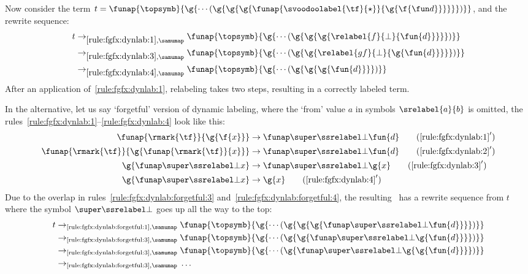 \begin{remark}
  \noindent
  Now consider the term $t = \funap{\topsymb}{\g{\cdots(\g{\g{\g{\funap{\svoodoolabel{\tf}{\star}}{\g{\f{\fun{d}}}}}}})}}$,
and the rewrite sequence:
  \begin{align*}
    t
    \to_{\ref{rule:fgfx:dynlab:1},\samumap} {}
    &
    \funap{\topsymb}{\g{\cdots(\g{\g{\g{\relabel{f}{\bot}{\fun{d}}}}})}}
    \\
    {} \to_{\ref{rule:fgfx:dynlab:3},\samumap} {}
    &
    \funap{\topsymb}{\g{\cdots(\g{\g{\relabel{\mit{gf}}{\bot}{\g{\fun{d}}}}})}}
    \\
    {} \to_{\ref{rule:fgfx:dynlab:4},\samumap} {}
    &
    \funap{\topsymb}{\g{\cdots(\g{\g{\g{\fun{d}}}})}}
  \end{align*}
  After an application of~\eqref{rule:fgfx:dynlab:1}, relabeling takes two steps,
  resulting in a correctly labeled term.

  In the alternative, let us say `forgetful' version of dynamic labeling,
  where the `from' value $a$ in symbols $\srelabel{a}{b}$ is omitted,
  the rules~\eqref{rule:fgfx:dynlab:1}--\eqref{rule:fgfx:dynlab:4} look like this:
  \begin{align}
    \funap{\rmark{\tf}}{\g{\f{x}}} &\to \relabelto{\bot}{\fun{d}}
    \label{rule:fgfx:dynlab:forgetful:1}
    \tag{$\ref{rule:fgfx:dynlab:1}'$}
    \\
    \funap{\rmark{\tf}}{\g{\funap{\rmark{\tf}}{x}}} &\to \relabelto{\bot}{\fun{d}}
    \label{rule:fgfx:dynlab:forgetful:2}
    \tag{$\ref{rule:fgfx:dynlab:2}'$}
    \\ 
    \g{\relabelto{\bot}{x}} &\to \relabelto{\bot}{\g{x}}
    \label{rule:fgfx:dynlab:forgetful:3}
    \tag{$\ref{rule:fgfx:dynlab:3}'$}
    \\
    \g{\relabelto{\bot}{x}} &\to \g{x}
    \label{rule:fgfx:dynlab:forgetful:4}
    \tag{$\ref{rule:fgfx:dynlab:4}'$}
  \end{align}
Due to the overlap in rules~\eqref{rule:fgfx:dynlab:forgetful:3} and~\eqref{rule:fgfx:dynlab:forgetful:4},
  the resulting \csTRS\ has a rewrite sequence 
  from $t$ where the symbol $\srelabelto{\bot}$ goes up all the way to the top:
  \begin{align*}
    t \to_{\text{\ref{rule:fgfx:dynlab:forgetful:1}},\samumap} {}
    &
    \funap{\topsymb}{\g{\cdots(\g{\g{\g{\relabelto{\bot}{\fun{d}}}}})}}
    \\
    {} \to_{\text{\ref{rule:fgfx:dynlab:forgetful:3}},\samumap} {}
    &
    \funap{\topsymb}{\g{\cdots(\g{\g{\relabelto{\bot}{\g{\fun{d}}}}})}}
    \\
    {} \to_{\text{\ref{rule:fgfx:dynlab:forgetful:3}},\samumap} {}
    &
    \funap{\topsymb}{\g{\cdots(\g{\relabelto{\bot}{\g{\g{\fun{d}}}}})}}
    \\
    {} \to_{\text{\ref{rule:fgfx:dynlab:forgetful:3}},\samumap} {}
    &
    \ldots
  \end{align*}
\end{remark}





